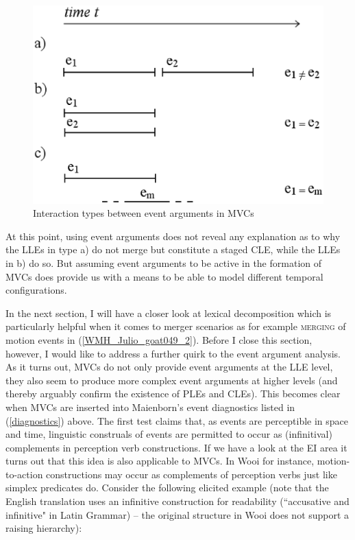 \begin{figure}
\includegraphics[width=1.0\textwidth]{figures/eventschemav2.eps} 
\caption{Interaction types between event arguments in MVCs}\label{fig:eventsmod}
\end{figure}

At this point, using event arguments does not reveal any explanation as to why the LLEs in type a) do not merge but constitute a staged CLE, while the LLEs in b) do so. But assuming event arguments to be active in the formation of MVCs does provide us with a means to be able to model different temporal configurations.

In the next section, I will have a closer look at lexical decomposition which is particularly helpful when it comes to  merger scenarios as for example \textsc{merging} of motion events in (\ref{WMH_Julio_goat049_2}). Before I close this section, however, I would like to address a further quirk to the event argument analysis. As it turns out, MVCs do not only provide event arguments at the LLE level, they also seem to produce more complex event arguments at higher levels (and thereby arguably confirm the existence of PLEs and CLEs). This becomes clear when MVCs are inserted into Maienborn's event diagnostics listed in (\ref{diagnostics}) above. The first test claims that, as events are perceptible in space and time, linguistic construals of events are permitted to occur as (infinitival) complements in perception verb constructions. If we have a look at the EI area it turns out that this idea is also applicable to MVCs. In Wooi for instance, motion-to-action constructions may occur as complements of perception verbs just like simplex predicates do. Consider the following elicited example (note that the English translation uses an infinitive construction for readability (``accusative and infinitive" in Latin Grammar) -- the original structure in Wooi does not support a raising hierarchy):


